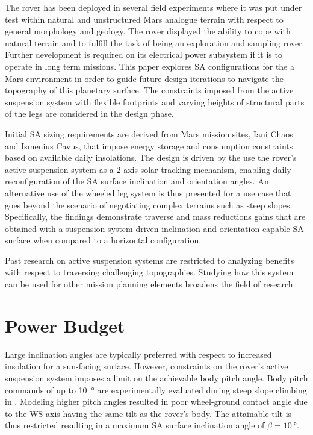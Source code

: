 \documentclass[twocolumn,letterpaper]{IEEEAerospaceCLS}  %
\begin{document}
The rover has been deployed in several field experiments where it was put under test within natural and unstructured Mars analogue terrain with respect to general morphology and geology. The rover displayed the ability to cope with natural terrain and to fulfill the task of being an exploration and sampling rover. Further development is required on its electrical power subsystem if it is to operate in long term missions. This paper explores \ac{SA} configurations for the a Mars environment in order to guide future design iterations to navigate the topography of this planetary surface. The constraints imposed from the active suspension system with flexible footprints and varying heights of structural parts of the legs are considered in the design phase.

Initial \ac{SA} sizing requirements are derived from Mars mission sites, Iani Chaos and Ismenius Cavus, that impose energy storage and consumption constraints based on available daily insolations. The design is driven by the use the rover's active suspension system as a 2-axis solar tracking mechanism, enabling daily reconfiguration of the \ac{SA} surface inclination and orientation angles. An alternative use of the wheeled leg system is thus presented for a use case that goes beyond the scenario of negotiating complex terrains such as steep slopes. Specifically, the findings demonstrate traverse and mass reductions gains that are obtained with a suspension system driven inclination and orientation capable \ac{SA} surface when compared to a horizontal configuration.

Past research on active suspension systems are restricted to analyzing benefits with respect to traversing challenging topographies. Studying how this system can be used for other mission planning elements broadens the field of research.

\section{Power Budget}

Large inclination angles are typically preferred with respect to increased insolation for a sun-facing surface. However, constraints on the rover's active suspension system imposes a limit on the achievable body pitch angle. Body pitch commands of up to \SI{10}{\degree} are experimentally evaluated during steep slope climbing in \cite{Cordes2018a}. Modeling higher pitch angles resulted in poor wheel-ground contact angle due to the \ac{WS} axis having the same tilt as the rover's body. The attainable tilt is thus restricted resulting in a maximum \ac{SA} surface inclination angle of $\beta = \SI{10}{\degree}$.
\end{document}
